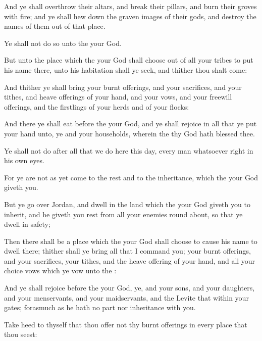 {And ye shall
overthrow their
altars, and
break their
pillars, and
burn their
groves with
fire; and ye shall hew
down the graven
images of their
gods, and
destroy the
names of them out of that
place.

Ye shall not do
so unto the
{} your
God.


\par }{\PP {}But unto the
place which the
{} your
God shall
choose out of all your
tribes to
put his
name there,
{} unto his
habitation shall ye
seek, and thither thou shalt
come:

And thither ye shall
bring your burnt
offerings, and your
sacrifices, and your
tithes, and heave
offerings of your
hand, and your
vows, and your freewill
offerings, and the
firstlings of your
herds and of your
flocks:

And there ye shall
eat
before the
{} your
God, and ye shall
rejoice in all that ye
put your
hand unto, ye and your
households, wherein the
{} thy
God hath
blessed thee.

Ye shall not
do after all
{} that we
do here this
day, every
man whatsoever
{}
right in his own
eyes.

For ye are not as yet
come to the
rest and to the
inheritance, which the
{} your
God
giveth you.

But
{} ye go
over
Jordan, and
dwell in the
land which the
{} your
God giveth you to
inherit, and
{} he giveth you
rest from all your
enemies round
about, so that ye
dwell in
safety;

Then there shall be a
place which the
{} your
God shall
choose to cause his
name to
dwell there; thither shall ye
bring all that I
command you; your burnt
offerings, and your
sacrifices, your
tithes, and the heave
offering of your
hand, and all your
choice
vows which ye
vow unto the
{}:

And ye shall
rejoice
before the
{} your
God, ye, and your
sons, and your
daughters, and your
menservants, and your
maidservants, and the
Levite that
{} within your
gates;
forasmuch as he hath no
part nor
inheritance with you.

Take
heed to thyself that thou
offer not thy burnt
offerings in every
place that thou
seest:

}
